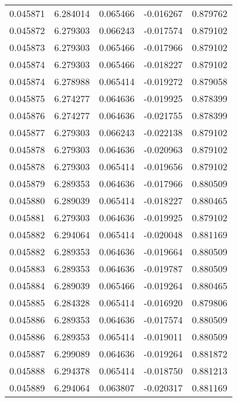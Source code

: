 \begin{tabular}{lrrrr}
0.045871    &  6.284014 &  0.065466 & -0.016267 &             0.879762 \\
0.045872    &  6.279303 &  0.066243 & -0.017574 &             0.879102 \\
0.045873    &  6.279303 &  0.065466 & -0.017966 &             0.879102 \\
0.045874    &  6.279303 &  0.065466 & -0.018227 &             0.879102 \\
0.045874    &  6.278988 &  0.065414 & -0.019272 &             0.879058 \\
0.045875    &  6.274277 &  0.064636 & -0.019925 &             0.878399 \\
0.045876    &  6.274277 &  0.064636 & -0.021755 &             0.878399 \\
0.045877    &  6.279303 &  0.066243 & -0.022138 &             0.879102 \\
0.045878    &  6.279303 &  0.064636 & -0.020963 &             0.879102 \\
0.045878    &  6.279303 &  0.065414 & -0.019656 &             0.879102 \\
0.045879    &  6.289353 &  0.064636 & -0.017966 &             0.880509 \\
0.045880    &  6.289039 &  0.065414 & -0.018227 &             0.880465 \\
0.045881    &  6.279303 &  0.064636 & -0.019925 &             0.879102 \\
0.045882    &  6.294064 &  0.065414 & -0.020048 &             0.881169 \\
0.045882    &  6.289353 &  0.064636 & -0.019664 &             0.880509 \\
0.045883    &  6.289353 &  0.064636 & -0.019787 &             0.880509 \\
0.045884    &  6.289039 &  0.065466 & -0.019264 &             0.880465 \\
0.045885    &  6.284328 &  0.065414 & -0.016920 &             0.879806 \\
0.045886    &  6.289353 &  0.064636 & -0.017574 &             0.880509 \\
0.045886    &  6.289353 &  0.065414 & -0.019011 &             0.880509 \\
0.045887    &  6.299089 &  0.064636 & -0.019264 &             0.881872 \\
0.045888    &  6.294378 &  0.065414 & -0.018750 &             0.881213 \\
0.045889    &  6.294064 &  0.063807 & -0.020317 &             0.881169 \\

\end{tabular}
